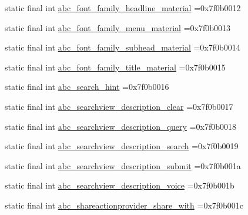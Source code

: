 \begin{DoxyCompactItemize}
\item 
static final int \mbox{\hyperlink{classbr_1_1unb_1_1cic_1_1mp_1_1marketmaster_1_1test_1_1R_1_1string_a4fef2bf49e7abf35103879640a963c72}{abc\+\_\+font\+\_\+family\+\_\+headline\+\_\+material}} =0x7f0b0012
\item 
static final int \mbox{\hyperlink{classbr_1_1unb_1_1cic_1_1mp_1_1marketmaster_1_1test_1_1R_1_1string_a27cee80f1025e766bb25e3e7dbe28f42}{abc\+\_\+font\+\_\+family\+\_\+menu\+\_\+material}} =0x7f0b0013
\item 
static final int \mbox{\hyperlink{classbr_1_1unb_1_1cic_1_1mp_1_1marketmaster_1_1test_1_1R_1_1string_a3edb9b65230de60342c23c1b6da85fa0}{abc\+\_\+font\+\_\+family\+\_\+subhead\+\_\+material}} =0x7f0b0014
\item 
static final int \mbox{\hyperlink{classbr_1_1unb_1_1cic_1_1mp_1_1marketmaster_1_1test_1_1R_1_1string_af52083183e2d49fcc7852db989044d69}{abc\+\_\+font\+\_\+family\+\_\+title\+\_\+material}} =0x7f0b0015
\item 
static final int \mbox{\hyperlink{classbr_1_1unb_1_1cic_1_1mp_1_1marketmaster_1_1test_1_1R_1_1string_a45a8b4298b6498ec7051fc63e3984051}{abc\+\_\+search\+\_\+hint}} =0x7f0b0016
\item 
static final int \mbox{\hyperlink{classbr_1_1unb_1_1cic_1_1mp_1_1marketmaster_1_1test_1_1R_1_1string_a79b5e5b752620c93780f4309ad230980}{abc\+\_\+searchview\+\_\+description\+\_\+clear}} =0x7f0b0017
\item 
static final int \mbox{\hyperlink{classbr_1_1unb_1_1cic_1_1mp_1_1marketmaster_1_1test_1_1R_1_1string_a2163b479218fbf05be181d86702e9670}{abc\+\_\+searchview\+\_\+description\+\_\+query}} =0x7f0b0018
\item 
static final int \mbox{\hyperlink{classbr_1_1unb_1_1cic_1_1mp_1_1marketmaster_1_1test_1_1R_1_1string_a5802d2092a970de0150ffc37f40fd2c2}{abc\+\_\+searchview\+\_\+description\+\_\+search}} =0x7f0b0019
\item 
static final int \mbox{\hyperlink{classbr_1_1unb_1_1cic_1_1mp_1_1marketmaster_1_1test_1_1R_1_1string_a360d739fbfbc75a5cb2f6bbb56ce3ef9}{abc\+\_\+searchview\+\_\+description\+\_\+submit}} =0x7f0b001a
\item 
static final int \mbox{\hyperlink{classbr_1_1unb_1_1cic_1_1mp_1_1marketmaster_1_1test_1_1R_1_1string_a6502e6633b71c7493566d3e2889bb19f}{abc\+\_\+searchview\+\_\+description\+\_\+voice}} =0x7f0b001b
\item 
static final int \mbox{\hyperlink{classbr_1_1unb_1_1cic_1_1mp_1_1marketmaster_1_1test_1_1R_1_1string_a6da074a5247cecd479720a60232e6f8f}{abc\+\_\+shareactionprovider\+\_\+share\+\_\+with}} =0x7f0b001c

\end{DoxyCompactItemize}
